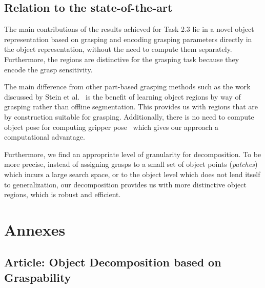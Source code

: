 \documentclass[a4paper,11pt,pdf]{pacmanreport}
\begin{document}

\subsection{Relation to the state-of-the-art}


The main contributions of the results achieved for Task 2.3 lie in a
novel object representation based on grasping and encoding grasping
parameters directly in the object representation, without the need to
compute them separately. Furthermore, the regions are distinctive for
the grasping task because they encode the grasp sensitivity.

The main difference from other part-based grasping methods such as the
work discussed by Stein et al.~\cite{lccp-grasp} is the benefit of
learning object regions by way of grasping rather than offline
segmentation. This provides us with regions that are by construction
suitable for grasping. Additionally, there is no need to compute
object pose for computing gripper
pose~\cite{saxena_grasp_novel_objects} which gives our approach a
computational advantage.

Furthermore, we find an appropriate level of granularity for
decomposition. To be more precise, instead of assigning grasps to a
small set of object points (\emph{patches})
\cite{saxena_deep_grasps,grasping_ng,grasping_mrf,kopicki2015a} which
incurs a large search space, or to the object level which does not
lend itself to generalization, our decomposition provides us with more
distinctive object regions, which is robust and efficient.




\newpage

\appendix
\section{Annexes}
\label{ann}


\subsection{Article: Object Decomposition based on Graspability}
\label{ann:wacv}
\end{document}
